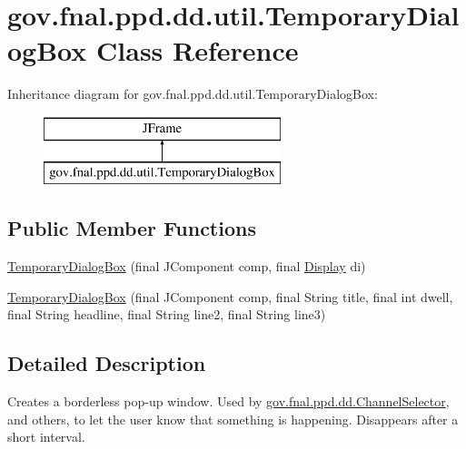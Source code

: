 \hypertarget{classgov_1_1fnal_1_1ppd_1_1dd_1_1util_1_1TemporaryDialogBox}{\section{gov.\-fnal.\-ppd.\-dd.\-util.\-Temporary\-Dialog\-Box Class Reference}
\label{classgov_1_1fnal_1_1ppd_1_1dd_1_1util_1_1TemporaryDialogBox}
}
Inheritance diagram for gov.\-fnal.\-ppd.\-dd.\-util.\-Temporary\-Dialog\-Box\-:\begin{figure}[H]
\begin{center}
\leavevmode
\includegraphics[height=2.000000cm]{classgov_1_1fnal_1_1ppd_1_1dd_1_1util_1_1TemporaryDialogBox}
\end{center}
\end{figure}
\subsection*{Public Member Functions}
\begin{DoxyCompactItemize}
\item 
\hyperlink{classgov_1_1fnal_1_1ppd_1_1dd_1_1util_1_1TemporaryDialogBox_ad9ce6f1fbd540890d49c154c9b032cc0}{Temporary\-Dialog\-Box} (final J\-Component comp, final \hyperlink{interfacegov_1_1fnal_1_1ppd_1_1dd_1_1signage_1_1Display}{Display} di)
\item 
\hyperlink{classgov_1_1fnal_1_1ppd_1_1dd_1_1util_1_1TemporaryDialogBox_a2ad3986b0c7dece6ae6550223bb592e7}{Temporary\-Dialog\-Box} (final J\-Component comp, final String title, final int dwell, final String headline, final String line2, final String line3)
\end{DoxyCompactItemize}


\subsection{Detailed Description}
Creates a borderless pop-\/up window. Used by \hyperlink{classgov_1_1fnal_1_1ppd_1_1dd_1_1ChannelSelector}{gov.\-fnal.\-ppd.\-dd.\-Channel\-Selector}, and others, to let the user know that something is happening. Disappears after a short interval.

